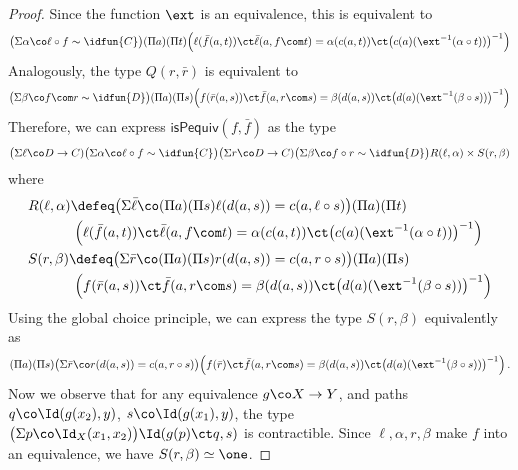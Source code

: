 \begin{proof}
Since the function $\ext$ is an equivalence, this is equivalent to
\begin{align*}
\big(\Sigma \alpha \co \ell \circ f \sim \idfun{C} \big) (\Pi a) (\Pi t) \Big(\ell(\bar{f}(a,t)) \ct \bar{\ell}(a, f \com t) = \alpha(c(a,t)) \ct \big(c(a)(\ext^{-1}(\alpha \circ t))\big)^{-1}\Big)
\end{align*}
Analogously, the type $Q(r,\bar{r})$ is equivalent to
\begin{align*}
\big(\Sigma \beta \co f \com r \sim \idfun{D} \big) (\Pi a) (\Pi s) \Big(f(\bar{r}(a,s)) \ct \bar{f}(a, r \com s) = \beta(d(a,s)) \ct \big(d(a)(\ext^{-1}(\beta \circ s))\big)^{-1}\Big)
\end{align*}
Therefore, we can express $\mathsf{isPequiv}(f,\bar{f})$ as the type
\[ \big(\Sigma \ell \co D\to C) \big(\Sigma \alpha \co \ell \circ f \sim \idfun{C}\big) \big(\Sigma r \co D\to C) \big(\Sigma \beta \co f \circ r \sim \idfun{D}\big) R(\ell,\alpha) \times S(r,\beta)\]
where
\begin{align*}
& R(\ell,\alpha) \defeq \big(\Sigma \bar{\ell} \co (\Pi a) (\Pi s) \ell(d(a,s))=c(a,\ell \circ s)\big) (\Pi a) (\Pi t) \\ & \;\;\;\;\;\;\;\;\;\;\;\; \Big(\ell(\bar{f}(a,t)) \ct \bar{\ell}(a, f \com t) = \alpha(c(a,t)) \ct \big(c(a)(\ext^{-1}(\alpha \circ t))\big)^{-1}\Big) \\
& S(r,\beta) \defeq \big(\Sigma \bar{r} \co (\Pi a) (\Pi s) r(d(a,s))=c(a,r \circ s) \big) (\Pi a) (\Pi s) \\ & \;\;\;\;\;\;\;\;\;\;\;\; \Big(f(\bar{r}(a,s)) \ct \bar{f}(a, r \com s) = \beta(d(a,s)) \ct \big(d(a)(\ext^{-1}(\beta \circ s))\big)^{-1}\Big)
\end{align*}
Using the global choice principle, we can express the type $S(r,\beta)$ equivalently as
\[  (\Pi a) (\Pi s) \big(\Sigma \bar{r} \co r(d(a,s))=c(a,r \circ s) \big) \Big(f(\bar{r}) \ct \bar{f}(a, r \com s) = \beta(d(a,s)) \ct \big(d(a)(\ext^{-1}(\beta \circ s))\big)^{-1}\Big) \, .
\]
Now we observe that for any equivalence $g \co X \to Y$, and paths $q \co \Id(g(x_2),y)$, $s \co \Id(g(x_1),y)$, the type $\big(\Sigma p \co \Id_X(x_1,x_2)\big) \Id(g(p) \ct q,s)$ is contractible. Since $\ell, \alpha, r, \beta$ make $f$ into an equivalence, we have $S(r,\beta) \simeq \one$.


\end{proof}
